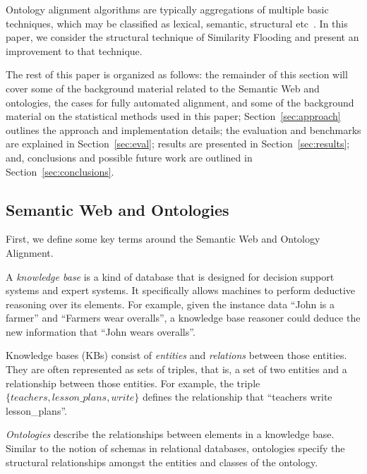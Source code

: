 \documentclass[letterpaper,twocolumn,12pt]{article}
\begin{document}
Ontology alignment algorithms are typically aggregations of multiple basic techniques, which may be classified as lexical, semantic, structural etc~\cite{euzenat:2007:ontology}.
In this paper, we consider the structural technique of Similarity Flooding and present an improvement to that technique.

\noindent The rest of this paper is organized as follows: 
the remainder of this section will cover some of the background material related to the Semantic Web and ontologies, the cases for fully automated alignment, and some of the background material on the statistical methods used in this paper; 
Section~\ref{sec:approach} outlines the approach and implementation details; 
the evaluation and benchmarks are explained in Section~\ref{sec:eval}; 
results are presented in Section~\ref{sec:results}; and, 
conclusions and possible future work are outlined in Section~\ref{sec:conclusions}.

\subsection{Semantic Web and Ontologies}
\label{subsec:semanticweb}
First, we define some key terms around the Semantic Web and Ontology Alignment.

A \textit{knowledge base} is a kind of database that is designed for decision support systems and expert systems. 
It specifically allows machines to perform deductive reasoning over its elements.
For example, given the instance data ``John is a farmer'' and ``Farmers wear overalls'', a knowledge base reasoner could deduce the new information that ``John wears overalls''.

Knowledge bases (KBs) consist of \textit{entities} and \textit{relations} between those entities. 
They are often represented as sets of triples, that is, a set of two entities and a relationship between those entities. 
For example, the triple ${\{teachers, lesson\_plans, write\}}$ defines the relationship that ``teachers write lesson\_plans''.

\textit{Ontologies} describe the relationships between elements in a knowledge base.
Similar to the notion of schemas in relational databases, ontologies specify the structural relationships amongst the entities and classes of the ontology.
\end{document}
